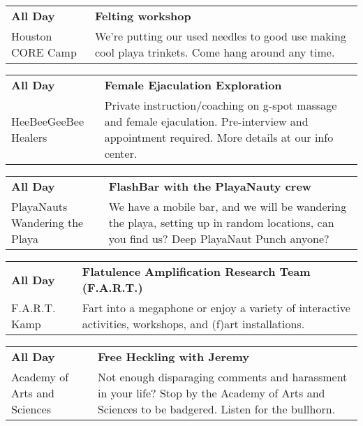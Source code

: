 \begin{tabular}{ p{1in} p{2.2in} }
    \textbf{All Day} & \textbf{Felting workshop} \\
    Houston CORE Camp \newline  & We're putting our used needles to good use making cool playa trinkets. Come hang around any time. \\
    \hline 
\end{tabular}
    
\begin{tabular}{ p{1in} p{2.2in} }
    \textbf{All Day} & \textbf{Female Ejaculation Exploration} \\
    HeeBeeGeeBee Healers \newline  & Private instruction/coaching on g-spot massage and female ejaculation.  Pre-interview and appointment required.  More details at our info center. \\
    \hline 
\end{tabular}
    
\begin{tabular}{ p{1in} p{2.2in} }
    \textbf{All Day} & \textbf{FlashBar with the PlayaNauty crew} \\
    PlayaNauts \newline Wandering the Playa & We have a mobile bar, and we will be wandering the playa, setting up in random locations, can you find us?
Deep PlayaNaut Punch anyone? \\
    \hline 
\end{tabular}
    
\begin{tabular}{ p{1in} p{2.2in} }
    \textbf{All Day} & \textbf{Flatulence Amplification Research Team (F.A.R.T.) } \\
    F.A.R.T. Kamp \newline  & Fart into a megaphone or enjoy a variety of interactive activities, workshops, and (f)art installations. \\
    \hline 
\end{tabular}
    
\begin{tabular}{ p{1in} p{2.2in} }
    \textbf{All Day} & \textbf{Free Heckling with Jeremy} \\
    Academy of Arts and Sciences \newline  & Not enough disparaging comments and harassment in your life?  Stop by the Academy of Arts and Sciences to be badgered.  Listen for the bullhorn. \\
    \hline 
\end{tabular}
    
